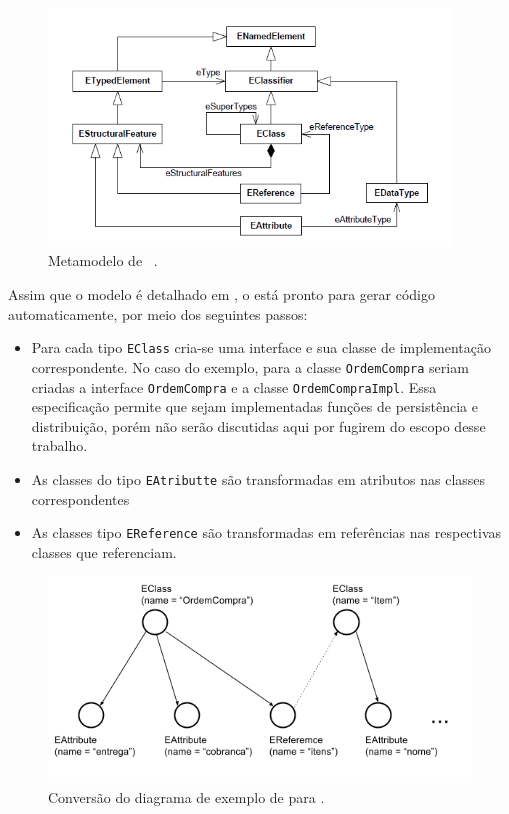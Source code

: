 \begin{figure}
	\centering
	\includegraphics[width=0.95\textwidth]{figuras/exemplos-emf/metamodelo-ecore.png}
	\caption{Metamodelo de \ecore~\cite{kern2008interchange}.}
	\label{metamodelo-ecore}
\end{figure}

Assim que o modelo é detalhado em \ecore, o \emf está pronto para gerar código automaticamente, por meio dos seguintes passos:

\begin{itemize}
	\item Para cada tipo \texttt{EClass} cria-se uma interface e sua classe de implementação correspondente. No caso do exemplo, para a classe \texttt{OrdemCompra} seriam criadas a interface \texttt{OrdemCompra} e a classe \texttt{OrdemCompraImpl}. Essa especificação permite que sejam implementadas funções de persistência e distribuição, porém não serão discutidas aqui por fugirem do escopo desse trabalho.
	\item As classes do tipo \texttt{EAtributte} são transformadas em atributos nas classes correspondentes
	\item As classes tipo \texttt{EReference} são transformadas em referências nas respectivas classes que referenciam.
\end{itemize}

\begin{figure}
	\centering
	\includegraphics[width=1\textwidth]{figuras/exemplos-emf/uml-to-ecore.png}
	\caption{Conversão do diagrama de exemplo de \uml para \ecore.}
	\label{exemplo-uml-to-ecore}
\end{figure}

